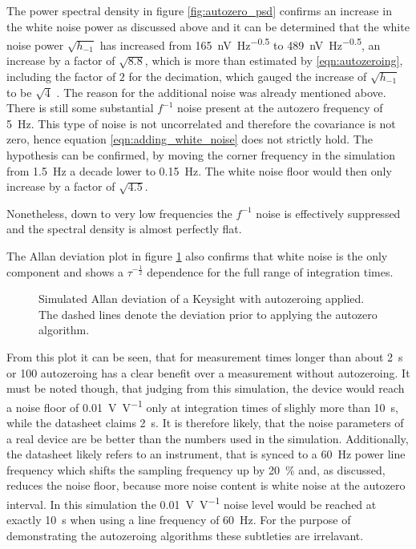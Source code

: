 The power spectral density in figure \ref{fig:autozero_psd} confirms an increase in the white noise power as discussed above and it can be determined that the white noise power $\sqrt{h_{-1}}$ has increased from \qty[power-half-as-sqrt, per-mode=symbol]{165}{\nV \Hz\tothe{-0.5}} to \qty[power-half-as-sqrt, per-mode=symbol]{489}{\nV \Hz\tothe{-0.5}}, an increase by a factor of $\sqrt{8.8}$, which is more than estimated by \ref{eqn:autozeroing}, including the factor of $2$ for the decimation, which gauged the increase of $\sqrt{h_{-1}}$ to be $\sqrt{4}$ . The reason for the additional noise was already mentioned above. There is still some substantial $f^{-1}$ noise present at the autozero frequency of \qty{5}{\Hz}. This type of noise is not uncorrelated and therefore the covariance is not zero, hence equation \ref{eqn:adding_white_noise} does not strictly hold. The hypothesis can be confirmed, by moving the corner frequency in the simulation from \qty{1.5}{\Hz} a decade lower to \qty{0.15}{\Hz}. The white noise floor would then only increase by a factor of $\sqrt{4.5}$.

Nonetheless, down to very low frequencies the $f^{-1}$ noise is effectively suppressed and the spectral density is almost perfectly flat.

The Allan deviation plot in figure \ref{fig:autozero_adev} also confirms that white noise is the only component and shows a $\tau^{-\frac 1 2}$ dependence for the full range of integration times.

\begin{figure}[hb]
    \centering
    
    \caption{Simulated Allan deviation of a Keysight  with autozeroing applied. The dashed lines denote the deviation prior to applying the autozero algorithm.}
    \label{fig:autozero_adev}
\end{figure}

From this plot it can be seen, that for measurement times longer than about \qty{2}{\s} or \qty{100}{\plc} autozeroing has a clear benefit over a measurement without autozeroing. It must be noted though, that judging from this simulation, the device would reach a noise floor of \qty[per-mode = symbol]{0.01}{\V \per \V} only at integration times of slighly more than \qty{10}{\s}, while the datasheet claims \qty{2}{\s}. It is therefore likely, that the noise parameters of a real device are be better than the numbers used in the simulation. Additionally, the datasheet likely refers to an instrument, that is synced to a \qty{60}{\Hz} power line frequency which shifts the sampling frequency up by \qty{20}{\percent} and, as discussed, reduces the noise floor, because more noise content is white noise at the autozero interval. In this simulation the \qty{0.01}{\V \per \V} noise level would be reached at exactly \qty{10}{\s} when using a line frequency of \qty{60}{\Hz}. For the purpose of demonstrating the autozeroing algorithms these subtleties are irrelavant.

